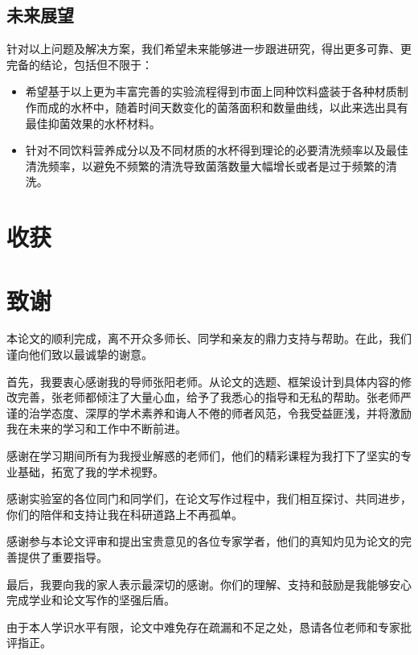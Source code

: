\documentclass[12pt,a4paper]{ctexart}
\begin{document}
\subsection{未来展望}
针对以上问题及解决方案，我们希望未来能够进一步跟进研究，得出更多可靠、更完备的结论，包括但不限于：
\begin{itemize}
    \item 希望基于以上更为丰富完善的实验流程得到市面上同种饮料盛装于各种材质制作而成的水杯中，随着时间天数变化的菌落面积和数量曲线，以此来选出具有最佳抑菌效果的水杯材料。
    \item 针对不同饮料营养成分以及不同材质的水杯得到理论的必要清洗频率以及最佳清洗频率，以避免不频繁的清洗导致菌落数量大幅增长或者是过于频繁的清洗。
\end{itemize}

\section{收获}

\clearpage
\thispagestyle{empty} 
\section*{致谢} %

本论文的顺利完成，离不开众多师长、同学和亲友的鼎力支持与帮助。在此，我们谨向他们致以最诚挚的谢意。

首先，我要衷心感谢我的导师张阳老师。从论文的选题、框架设计到具体内容的修改完善，张老师都倾注了大量心血，给予了我悉心的指导和无私的帮助。张老师严谨的治学态度、深厚的学术素养和诲人不倦的师者风范，令我受益匪浅，并将激励我在未来的学习和工作中不断前进。

感谢在学习期间所有为我授业解惑的老师们，他们的精彩课程为我打下了坚实的专业基础，拓宽了我的学术视野。

感谢实验室的各位同门和同学们，在论文写作过程中，我们相互探讨、共同进步，你们的陪伴和支持让我在科研道路上不再孤单。

感谢参与本论文评审和提出宝贵意见的各位专家学者，他们的真知灼见为论文的完善提供了重要指导。

最后，我要向我的家人表示最深切的感谢。你们的理解、支持和鼓励是我能够安心完成学业和论文写作的坚强后盾。

由于本人学识水平有限，论文中难免存在疏漏和不足之处，恳请各位老师和专家批评指正。

\end{document}
